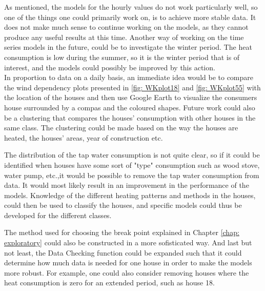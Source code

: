 \noindent As mentioned, the models for the hourly values do not ​​work particularly well, so one of the things one could primarily work on, is to achieve more stable data. It does not make much sense to continue working on the models, as they cannot produce any useful results at this time. Another way of working on the time series models in the future, could be to investigate the winter period. The heat consumption is low during the summer, so it is the winter period that is of interest, and the models could possibly be improved by this action. \\

\noindent In proportion to data on a daily basis, an immediate idea would be to compare the wind dependency plots presented in \cref{fig: WKplot18} and \cref{fig: WKplot55} with the location of the houses and then use Google Earth to visualize the consumers house surrounded by a compas and the coloured shapes. Future work could also be a clustering that compares the houses' consumption with other houses in the same class. The clustering could be made based on the way the houses are heated, the houses' areas, year of construction etc.

\noindent The distribution of the tap water consumption is not quite clear, so if it could be identified when houses have some sort of "type" consumption such as wood stove, water pump, etc.,it would be possible to remove the tap water consumption from data. It would most likely result in an improvement in the performance of the models. Knowledge of the different heating patterns and methods in the houses, could then be used to classify the houses, and specific models could thus be developed for the different classes.

\noindent The method used for choosing the break point explained in Chapter \ref{chap: exploratory} could also be constructed in a more sofisticated way. And last but not least, the Data Checking function could be expanded such that it could determine how much data is needed for one house in order to make the models more robust. For example, one could also consider removing houses where the heat consumption is zero for an extended period, such as house 18.
